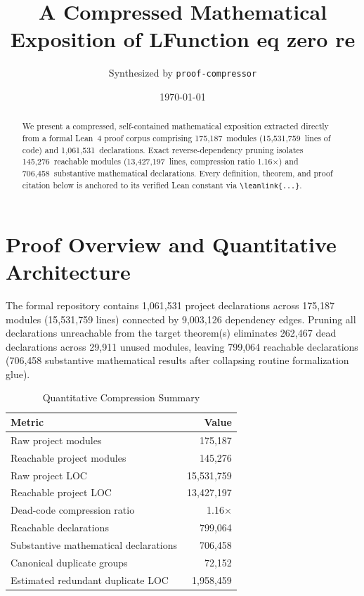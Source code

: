 \documentclass[11pt,reqno]{amsart}
\title[A Compressed Mathematical Exposition of LFunction eq zero ...]{A Compressed Mathematical Exposition of LFunction eq zero re}
\author{Synthesized by \texttt{proof-compressor}}
\date{\today}
\theoremstyle{plain}
\theoremstyle{definition}
\begin{document}
\begin{abstract}
We present a compressed, self-contained mathematical exposition extracted directly from a formal Lean~4 proof corpus comprising 175,187~modules (15,531,759~lines of code) and 1,061,531~declarations. Exact reverse-dependency pruning isolates 145,276~reachable modules (13,427,197~lines, compression ratio 1.16$\times$) and 706,458~substantive mathematical declarations. Every definition, theorem, and proof citation below is anchored to its verified Lean constant via \texttt{\textbackslash leanlink\{...\}}.
\end{abstract}
\maketitle
\tableofcontents

\section{Proof Overview and Quantitative Architecture}

The formal repository contains 1,061,531 project declarations across 175,187 modules (15,531,759 lines) connected by 9,003,126 dependency edges. Pruning all declarations unreachable from the target theorem(s) eliminates 262,467 dead declarations across 29,911 unused modules, leaving 799,064 reachable declarations (706,458 substantive mathematical results after collapsing routine formalization glue).

\begin{table}[ht]
\centering
\caption{Quantitative Compression Summary}
\begin{tabular}{lr}
\toprule
Metric & Value \\
\midrule
Raw project modules & 175,187 \\
Reachable project modules & 145,276 \\
Raw project LOC & 15,531,759 \\
Reachable project LOC & 13,427,197 \\
Dead-code compression ratio & 1.16$\times$ \\
Reachable declarations & 799,064 \\
Substantive mathematical declarations & 706,458 \\
Canonical duplicate groups & 72,152 \\
Estimated redundant duplicate LOC & 1,958,459 \\
\bottomrule
\end{tabular}
\end{table}
\end{document}

